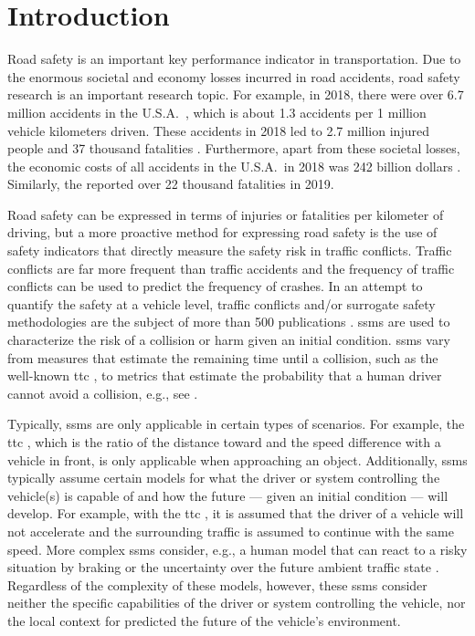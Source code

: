 \section{Introduction}
\label{sec:introduction}

Road safety is an important key performance indicator in transportation. 
Due to the enormous societal and economy losses incurred in road accidents, road safety research is an important research topic.
For example, in 2018, there were over 6.7 million accidents in the U.S.A.\ \autocite{nhtsa2020summary}, which is about 1.3 accidents per 1 million vehicle kilometers driven.
These accidents in 2018 led to 2.7 million injured people and 37 thousand fatalities \autocite{nhtsa2020summary}.
Furthermore, apart from these societal losses, the economic costs of all accidents in the U.S.A.\ in 2018 was 242 billion dollars \autocite{nhtsa2020summary}.
Similarly, the \textcite{eu2020roadsafety} reported over 22 thousand fatalities in 2019.

Road safety can be expressed in terms of injuries or fatalities per kilometer of driving, but a more proactive method for expressing road safety is the use of safety indicators that directly measure the safety risk in traffic conflicts.
Traffic conflicts are far more frequent than traffic accidents and the frequency of traffic conflicts can be used to predict the frequency of crashes.
In an attempt to quantify the safety at a vehicle level, traffic conflicts and/or surrogate safety methodologies are the subject of more than 500 publications \autocite{arun2021systematic}.
\acp{ssm} are used to characterize the risk of a collision or harm given an initial condition. 
\acp{ssm} vary from measures that estimate the remaining time until a collision, such as the well-known \ac{ttc} \autocite{hayward1972near}, to metrics that estimate the probability that a human driver cannot avoid a collision, e.g., see \autocite{wang2014evaluation}.

Typically, \acp{ssm} are only applicable in certain types of scenarios.
For example, the \ac{ttc} \autocite{hayward1972near}, which is the ratio of the distance toward and the speed difference with a vehicle in front, is only applicable when approaching an object.
Additionally, \acp{ssm} typically assume certain models for what the driver or system controlling the vehicle(s) is capable of and how the future --- given an initial condition --- will develop. 
For example, with the \ac{ttc} \autocite{hayward1972near}, it is assumed that the driver of a vehicle will not accelerate and the surrounding traffic is assumed to continue with the same speed. 
More complex \acp{ssm} consider, e.g., a human model that can react to a risky situation by braking \autocite{wang2014evaluation} or the uncertainty over the future ambient traffic state \autocite{mullakkal2020probabilistic}.
Regardless of the complexity of these models, however, these \acp{ssm} consider neither the specific capabilities of the driver or system controlling the vehicle, nor the local context for predicted the future of the vehicle's environment.  

